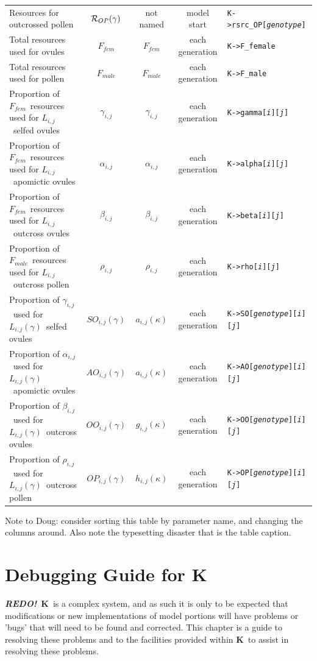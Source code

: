 \documentclass[10pt,twoside,a4paper,fleqn]{report}
\numberwithin{equation}{section}  %
\newcommand{\REDO}{{\bf {\em REDO!}}}
\newcommand{\K}{{\bf K}}
\newcommand{\Kmember}[1]{\mbox{{\tt K->#1}}}
\newcommand{\Kmemberi}[2]{\mbox{{\tt K->#1[{\it #2}\/]}}}
\newcommand{\Kmemberij}[3]{\mbox{{\tt K->#1[{\it #2}\/][{\it #3}\/]}}}
\newcommand{\Kmemberijk}[4]{\mbox{{\tt K->#1[{\it #2}\/][{\it #3}\/][{\it #4}\/]}}}
\newcommand{\Lij}{\mbox{$L_{i,j}$}}              %
\newcommand{\Lgij}{\mbox{$L_{i,j}(\gamma)$}}     %
\newcommand{\ROPg}{\mbox{${\cal R}_{OP}(\gamma)$}}
\newcommand{\Ffemale}{\mbox{$F_{fem}$}}
\newcommand{\Fmale}{\mbox{$F_{male}$}}
\newcommand{\betaij}{\mbox{$\beta_{i,j}$}}
\newcommand{\gammaij}{\mbox{$\gamma_{i,j}$}}
\newcommand{\alphaij}{\mbox{$\alpha_{i,j}$}}
\newcommand{\rhoij}{\mbox{$\rho_{i,j}$}}
\newcommand{\SOijg}{\mbox{$SO_{i,j}(\gamma)$}}
\newcommand{\AOijg}{\mbox{$AO_{i,j}(\gamma)$}}
\newcommand{\OOijg}{\mbox{$OO_{i,j}(\gamma)$}}
\newcommand{\OPijg}{\mbox{$OP_{i,j}(\gamma)$}}
\begin{document}
{\begin{landscape}
\begin{longtable}{p{2in}|c|c|c|l}
Resources for outcrossed pollen & \ROPg       & not named			& model start &	\Kmemberi{rsrc\_OP}{genotype} \\
Total resources used for ovules	& \Ffemale				&	\Ffemale			& each generation & \Kmember{F\_female} \\
Total resources used for pollen	& \Fmale					&	\Fmale				& each generation & \Kmember{F\_male} \\
Proportion of \Ffemale\ resources used for \Lij\ selfed ovules	&	\gammaij	&	\gammaij			& each generation & \Kmemberij{gamma}{i}{j} \\
Proportion of \Ffemale\ resources used for \Lij\ apomictic ovules	&	\alphaij	&	\alphaij	& each generation & \Kmemberij{alpha}{i}{j} \\
Proportion of \Ffemale\ resources used for \Lij\ outcross ovules	&	\betaij	&	\betaij				& each generation & \Kmemberij{beta}{i}{j} \\
Proportion of \Fmale\ resources used for \Lij\ outcross pollen	&	\rhoij	&	\rhoij				& each generation & \Kmemberij{rho}{i}{j} \\
Proportion of \gammaij\ used for \Lgij\ selfed ovules &	\SOijg	&	$a_{i,j}(\kappa)$\dag	& each generation & \Kmemberijk{SO}{genotype}{i}{j} \\
Proportion of \alphaij\ used for \Lgij\ apomictic ovules &	\AOijg	&	$a_{i,j}(\kappa)$\dag	& each generation & \Kmemberijk{AO}{genotype}{i}{j} \\
Proportion of \betaij\ used for \Lgij\ outcross ovules &	\OOijg	&	$g_{i,j}(\kappa)$	& each generation & \Kmemberijk{OO}{genotype}{i}{j} \\
Proportion of \rhoij\ used for \Lgij\ outcross pollen &	\OPijg	&	$h_{i,j}(\kappa)$	& each generation & \Kmemberijk{OP}{genotype}{i}{j} \\
\end{longtable}

\end{landscape}

Note to Doug: consider sorting this table by parameter name, and changing the columns around.  Also note the typesetting disaster that is the table caption.

\chapter{Debugging Guide for \K}

\REDO\  \K\ is a complex system, and as such it is only to be expected that modifications or new implementations of model portions will have problems or 'bugs' that will need to be found and corrected.  This chapter is a guide to resolving these problems and to the facilities provided within \K\ to assist in resolving these problems.

}
\end{document}
